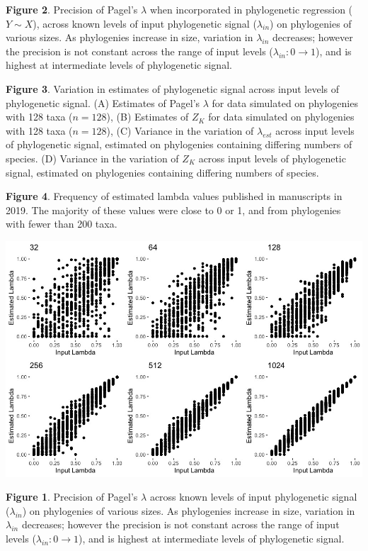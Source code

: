 \documentclass[
]{article}
\begin{document}
\textbf{Figure 2}. Precision of Pagel's \(\lambda\) when incorporated in
phylogenetic regression (\(Y\sim X\)), across known levels of input
phylogenetic signal (\(\lambda_{in}\)) on phylogenies of various sizes.
As phylogenies increase in size, variation in \(\lambda_{in}\)
decreases; however the precision is not constant across the range of
input levels (\(\lambda_{in}: 0 \to 1\)), and is highest at intermediate
levels of phylogenetic signal. \hfill\break

\textbf{Figure 3}. Variation in estimates of phylogenetic signal across
input levels of phylogenetic signal. (A) Estimates of Pagel's
\(\lambda\) for data simulated on phylogenies with 128 taxa (\(n=128\)),
(B) Estimates of \(Z_K\) for data simulated on phylogenies with 128 taxa
(\(n=128\)), (C) Variance in the variation of \(\lambda_{est}\) across
input levels of phylogenetic signal, estimated on phylogenies containing
differing numbers of species. (D) Variance in the variation of \(Z_K\)
across input levels of phylogenetic signal, estimated on phylogenies
containing differing numbers of species. \hfill\break

\textbf{Figure 4}. Frequency of estimated lambda values published in
manuscripts in 2019. The majority of these values were close to 0 or 1,
and from phylogenies with fewer than 200 taxa.

\newpage

\includegraphics[width=0.95\linewidth]{Fig1}

\singlespacing \textbf{Figure 1}. Precision of Pagel's \(\lambda\)
across known levels of input phylogenetic signal (\(\lambda_{in}\)) on
phylogenies of various sizes. As phylogenies increase in size, variation
in \(\lambda_{in}\) decreases; however the precision is not constant
across the range of input levels (\(\lambda_{in}: 0 \to 1\)), and is
highest at intermediate levels of phylogenetic signal.
\end{document}
